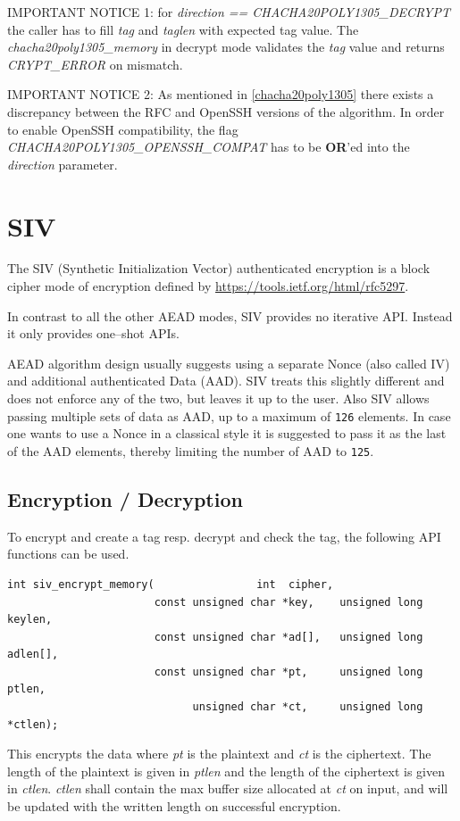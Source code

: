 \documentclass[synpaper]{book}
\newcommand{\mysection}[1]    %
	{                   %
	\section{#1}
   \markboth{\textsf{www.libtom.net}}{\thesection ~ {#1}}
	}
\begin{document}
IMPORTANT NOTICE 1: for \textit{direction == CHACHA20POLY1305\_DECRYPT} the caller has to fill \textit{tag} and \textit{taglen} with expected
tag value. The \textit{chacha20poly1305\_memory} in decrypt mode validates the \textit{tag} value and returns \textit{CRYPT\_ERROR} on mismatch.

IMPORTANT NOTICE 2: As mentioned in \ref{chacha20poly1305} there exists a discrepancy between the RFC and OpenSSH versions of the algorithm.
In order to enable OpenSSH compatibility, the flag \textit{CHACHA20POLY1305\_OPENSSH\_COMPAT} has to be \textbf{OR}'ed into
the \textit{direction} parameter.


\mysection{SIV}
\label{SIV}

The SIV (Synthetic Initialization Vector) authenticated encryption is a block cipher mode of encryption
defined by \url{https://tools.ietf.org/html/rfc5297}.

In contrast to all the other AEAD modes, SIV provides no iterative API. Instead it only provides one--shot APIs.

AEAD algorithm design usually suggests using a separate Nonce (also called IV) and additional authenticated Data (AAD).
SIV treats this slightly different and does not enforce any of the two, but leaves it up to the user.
Also SIV allows passing multiple sets of data as AAD, up to a maximum of \texttt{126} elements.
In case one wants to use a Nonce in a classical style it is suggested to pass it as the last of the AAD elements,
thereby limiting the number of AAD to \texttt{125}.

\subsection{Encryption / Decryption}
To encrypt and create a tag resp. decrypt and check the tag, the following API functions can be used.

\begin{verbatim}
int siv_encrypt_memory(                int  cipher,
                       const unsigned char *key,    unsigned long  keylen,
                       const unsigned char *ad[],   unsigned long  adlen[],
                       const unsigned char *pt,     unsigned long  ptlen,
                             unsigned char *ct,     unsigned long *ctlen);
\end{verbatim}
This encrypts the data where \textit{pt} is the plaintext and \textit{ct} is the ciphertext.
The length of the plaintext is given in \textit{ptlen} and the length of the ciphertext is given in \textit{ctlen}.
\textit{ctlen} shall contain the max buffer size allocated at \textit{ct} on input, and will be updated with the
written length on successful encryption.
\end{document}

